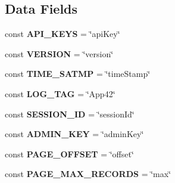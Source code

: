\subsection*{Data Fields}
\begin{DoxyCompactItemize}
\item 
\hypertarget{class_p_a_e___constants_a86161e34465acb0ba061f85c3bc21f57}{const {\bfseries A\+P\+I\+\_\+\+K\+E\+Y\+S} = \char`\"{}api\+Key\char`\"{}}\label{class_p_a_e___constants_a86161e34465acb0ba061f85c3bc21f57}

\item 
\hypertarget{class_p_a_e___constants_af71005841ce53adac00581ab0ba24c1f}{const {\bfseries V\+E\+R\+S\+I\+O\+N} = \char`\"{}version\char`\"{}}\label{class_p_a_e___constants_af71005841ce53adac00581ab0ba24c1f}

\item 
\hypertarget{class_p_a_e___constants_aa3fabc04d66c18eea2d81096de007c93}{const {\bfseries T\+I\+M\+E\+\_\+\+S\+A\+T\+M\+P} = \char`\"{}time\+Stamp\char`\"{}}\label{class_p_a_e___constants_aa3fabc04d66c18eea2d81096de007c93}

\item 
\hypertarget{class_p_a_e___constants_aaa65bb66974ec4dcec9629c3cdbf0c7a}{const {\bfseries L\+O\+G\+\_\+\+T\+A\+G} = \char`\"{}App42\char`\"{}}\label{class_p_a_e___constants_aaa65bb66974ec4dcec9629c3cdbf0c7a}

\item 
\hypertarget{class_p_a_e___constants_ae4af41087b28652699de87e9ab84077c}{const {\bfseries S\+E\+S\+S\+I\+O\+N\+\_\+\+I\+D} = \char`\"{}session\+Id\char`\"{}}\label{class_p_a_e___constants_ae4af41087b28652699de87e9ab84077c}

\item 
\hypertarget{class_p_a_e___constants_a5480d965c41631689efcb07c113717a6}{const {\bfseries A\+D\+M\+I\+N\+\_\+\+K\+E\+Y} = \char`\"{}admin\+Key\char`\"{}}\label{class_p_a_e___constants_a5480d965c41631689efcb07c113717a6}

\item 
\hypertarget{class_p_a_e___constants_a017f9ab981bd40bb37bc495069e198c5}{const {\bfseries P\+A\+G\+E\+\_\+\+O\+F\+F\+S\+E\+T} = \char`\"{}offset\char`\"{}}\label{class_p_a_e___constants_a017f9ab981bd40bb37bc495069e198c5}

\item 
\hypertarget{class_p_a_e___constants_a267c74a6b0493fbf9a924840e008596d}{const {\bfseries P\+A\+G\+E\+\_\+\+M\+A\+X\+\_\+\+R\+E\+C\+O\+R\+D\+S} = \char`\"{}max\char`\"{}}\label{class_p_a_e___constants_a267c74a6b0493fbf9a924840e008596d}


\end{DoxyCompactItemize}
